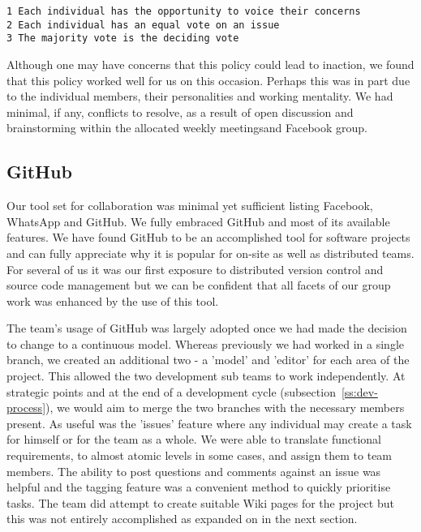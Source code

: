 \begin{lstlisting}[caption={Decision Making Agreement}]
1 Each individual has the opportunity to voice their concerns
2 Each individual has an equal vote on an issue
3 The majority vote is the deciding vote
\end{lstlisting}
 
Although one may have concerns that this policy could lead to inaction, we found that this policy worked well for us on this occasion. Perhaps this was in part due to the individual members, their personalities and working mentality. We had minimal, if any, conflicts to resolve, as a result of open discussion and brainstorming within the allocated weekly meetings\footnotemark[02] and Facebook group.

\subsection{GitHub}
Our tool set for collaboration was minimal yet sufficient listing Facebook, WhatsApp and GitHub. We fully embraced GitHub and most of its available features. We have found GitHub to be an accomplished tool for software projects and can fully appreciate why it is popular for on-site as well as distributed teams. For several of us it was our first exposure to distributed version control and source code management but we can be confident that all facets of our group work was enhanced by the use of this tool.

The team's usage of GitHub was largely adopted once we had made the decision to change to a continuous model. Whereas previously we had worked in a single branch, we created an additional two - a 'model' and 'editor' for each area of the project.  This allowed the two development sub teams to work independently. At strategic points and at the end of a development cycle (subsection~\ref{ss:dev-process}), we would aim to merge the two branches with the necessary members present. As useful was the 'issues' feature where any individual may create a task for himself or for the team as a whole. We were able to translate functional requirements, to almost atomic levels in some cases, and assign them to team members. The ability to post questions and comments against an issue was helpful and the tagging feature was a convenient method to quickly prioritise tasks. The team  did attempt to create suitable Wiki pages for the project but this was not entirely accomplished as expanded on in the next section.

